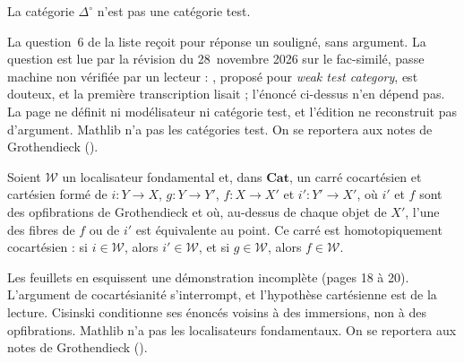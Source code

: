 \begin{encadre}
\begin{theoreme*}\nonverifie
La catégorie $\Delta^\circ$ n'est pas une catégorie test.
\end{theoreme*}
\end{encadre}
{\small La question~6 de la liste reçoit pour réponse un  souligné, sans argument. La question est lue  par la révision du 28~novembre 2026 sur le fac-similé, passe machine non vérifiée par un lecteur : , proposé pour \emph{weak test category}, est douteux, et la première transcription lisait  ; l'énoncé ci-dessus n'en dépend pas. La page ne définit ni modélisateur ni catégorie test, et l'édition ne reconstruit pas d'argument. Mathlib n'a pas les catégories test. On se reportera aux notes de Grothendieck ().\par}

\begin{encadre}
\begin{theoreme*}\nonverifie
Soient $\mathcal W$ un localisateur fondamental et, dans $\mathbf{Cat}$, un carré cocartésien et cartésien formé de $i : Y \to X$, $g : Y \to Y'$, $f : X \to X'$ et $i' : Y' \to X'$, où $i'$ et $f$ sont des opfibrations de Grothendieck et où, au-dessus de chaque objet de $X'$, l'une des fibres de $f$ ou de $i'$ est équivalente au point. Ce carré est homotopiquement cocartésien : si $i \in \mathcal W$, alors $i' \in \mathcal W$, et si $g \in \mathcal W$, alors $f \in \mathcal W$.
\end{theoreme*}
\end{encadre}
{\small Les feuillets en esquissent une démonstration incomplète (pages 18 à 20). L'argument de cocartésianité s'interrompt, et l'hypothèse cartésienne est de la lecture. Cisinski conditionne ses énoncés voisins à des immersions, non à des opfibrations. Mathlib n'a pas les localisateurs fondamentaux. On se reportera aux notes de Grothendieck ().\par}

